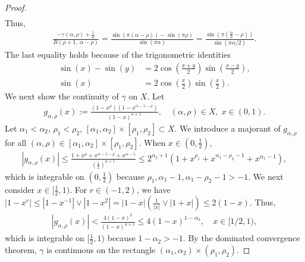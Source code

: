 \documentclass[12pt, a4paper]{amsart}
\begin{document}
\begin{proof}
\begin{align*}
\end{align*} 
Thus,
\begin{align*}
    \frac{-\gamma(\alpha, \rho) + \frac{1}{\alpha}}{B\left(\rho+1,\ \alpha-\rho\right)} = \frac{\sin\left(\pi\left(\alpha-\rho\right)\right)-\sin\left(\pi \rho\right)}{\sin\left(\pi\alpha\right)} = \frac{\sin\left(\pi\left(\frac{\alpha}{2}-\rho\right)\right)}{\sin(\pi\alpha/2)}.
\end{align*}
The last equality holds because of the trigonometric identities 
\begin{align*}
    \sin\left(x\right)-\sin\left(y\right)&=2\cos\left(\frac{x+y}{2}\right)\sin\left(\frac{x-y}{2}\right),
    \\
    \sin(x)&=2\cos\left(\frac{x}{2}\right)\sin\left(\frac{x}{2}\right).
\end{align*}
We next  show the continuity of $\gamma$ on $X$. Let 
\begin{align*}
    g_{\alpha, \rho}(x) := \frac{\left(1-x^{\rho}\right)\left(1-x^{\alpha-1-\rho}\right)}{\left(1-x\right)^{\alpha+1}}, \quad (\alpha, \rho) \in X,\; x \in (0, 1).
\end{align*}
 Let $\alpha_1 < \alpha_2$, $\rho_1 < \rho_2$, $[\alpha_1, \alpha_2] \times [\rho_1, \rho_2] \subset X$. We introduce a majorant of $g_{\alpha, \rho}$ for all $(\alpha, \rho) \in [\alpha_1, \alpha_2] \times [\rho_1, \rho_2]$. When $x \in (0, \frac{1}{2})$,
\begin{align*}
    |g_{\alpha, \rho}(x)| \leq \frac{1 + x^\rho + x^{\alpha - 1- \rho} + x^{\alpha - 1}}{(\frac{1}{2})^{\alpha + 1}} \leq 2^{\alpha_2 + 1}(1 + x^{\rho_1} + x^{\alpha_1 - \rho_2 - 1} + x^{\alpha_1 - 1}),
\end{align*}
which is integrable on $(0, \frac{1}{2})$ because $\rho_1, \alpha_1 - 1, \alpha_1 - \rho_2 - 1 > -1$. We next consider $x \in [\frac{1}{2}, 1)$. For $r \in (-1, 2)$, we have $|1 - x^r| \leq |1 - x^{-1}| \lor |1 - x^2| = |1-x|(\frac{1}{|x|} \vee |1+x|) \leq 2(1 - x)$.
  Thus,
\begin{align*}
    |g_{\alpha, \rho}(x)| < \frac{4(1 - x)^2}{(1 - x)^{\alpha + 1}} \leq 4(1 - x)^{1 - \alpha_2},\quad x\in [1/2,1),
\end{align*}
which is integrable on $[\frac{1}{2}, 1)$ because $1 - \alpha_2 > -1$. By the dominated convergence theorem, $\gamma$ is continuous on the rectangle $(\alpha_1, \alpha_2) \times (\rho_1, \rho_2)$.
\end{proof}
\end{document}
